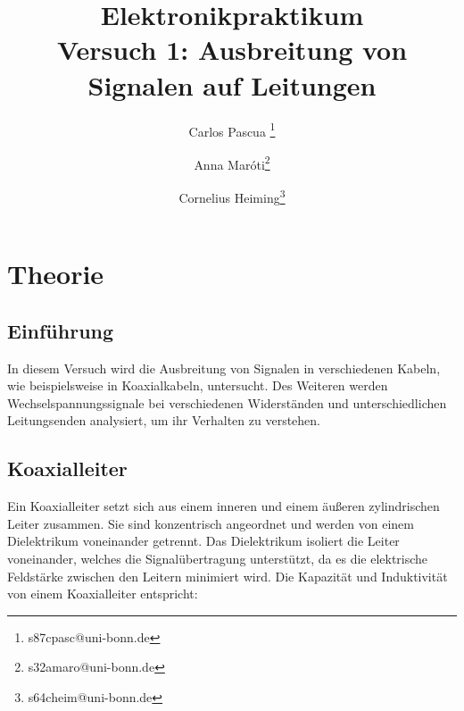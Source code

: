 \documentclass{article}
\begin{document}
    \title{Elektronikpraktikum \\ \textbf{Versuch 1: Ausbreitung von Signalen auf Leitungen}}
    \author[1]{Carlos Pascua \thanks{s87cpasc@uni-bonn.de}}
    \author[1]{Anna Maróti\thanks{s32amaro@uni-bonn.de}}
    \author[1]{Cornelius Heiming\thanks{s64cheim@uni-bonn.de}}
    \begin{titlepage}
     \maketitle   
    \end{titlepage}
        
\tableofcontents
\newpage
{}

\pagestyle{fancy}
\fancyhead[R]{\thepage}
\fancyhead[L]{\leftmark}

\section{Theorie}

\subsection*{Einführung}

In diesem Versuch wird die Ausbreitung von Signalen in verschiedenen Kabeln, wie beispielsweise in Koaxialkabeln, 
untersucht. Des Weiteren werden Wechselspannungssignale bei verschiedenen Widerständen und unterschiedlichen 
Leitungsenden analysiert, um ihr Verhalten zu verstehen.



\subsection*{Koaxialleiter}

Ein Koaxialleiter setzt sich aus einem inneren und einem äußeren zylindrischen Leiter zusammen. Sie sind konzentrisch angeordnet und werden von einem Dielektrikum voneinander getrennt. Das Dielektrikum isoliert die Leiter voneinander, welches die Signalübertragung unterstützt, da es die elektrische Feldstärke zwischen den Leitern minimiert wird. 
Die Kapazität und Induktivität von einem Koaxialleiter entspricht:
\end{document}
